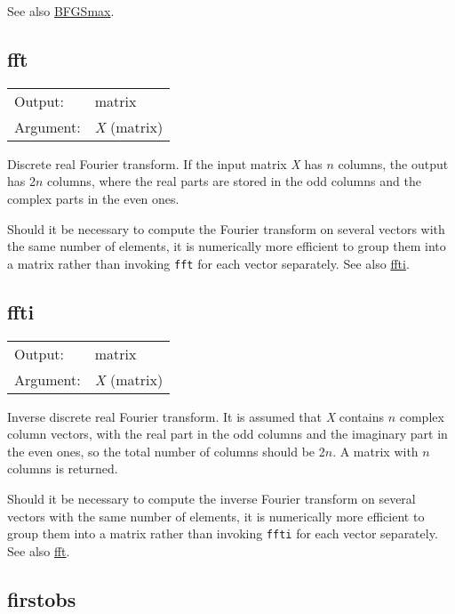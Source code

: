 	  See also \hyperlink{func-BFGSmax}{BFGSmax}.

\subsection{fft}
\hypertarget{func-fft}{}

\begin{tabular}{ll}
Output:     & matrix\\
Argument:   & \textsl{X} (matrix)\\
\end{tabular}

	  Discrete real Fourier transform. If the input matrix
	  \textsl{X} has \ensuremath{n} columns, the output has
	  2\ensuremath{n} columns, where the real parts are stored in the
	  odd columns and the complex parts in the even ones.

	  Should it be necessary to compute the Fourier transform on several
	  vectors with the same number of elements, it is numerically more
	  efficient to group them into a matrix rather than invoking
	  \texttt{fft} for each vector separately.  
	  See also \hyperlink{func-ffti}{ffti}.

\subsection{ffti}
\hypertarget{func-ffti}{}

\begin{tabular}{ll}
Output:     & matrix\\
Argument:   & \textsl{X} (matrix)\\
\end{tabular}

	  Inverse discrete real Fourier transform. It is assumed that
	  \textsl{X} contains \ensuremath{n} complex column
	  vectors, with the real part in the odd columns and the imaginary
	  part in the even ones, so the total number of columns should be
	  2\ensuremath{n}. A matrix with \ensuremath{n} columns is
	  returned.

	  Should it be necessary to compute the inverse Fourier transform on
	  several vectors with the same number of elements, it is
	  numerically more efficient to group them into a matrix rather
	  than invoking \texttt{ffti} for each vector separately.
	  See also \hyperlink{func-fft}{fft}.

\subsection{firstobs}
\hypertarget{func-firstobs}{}

